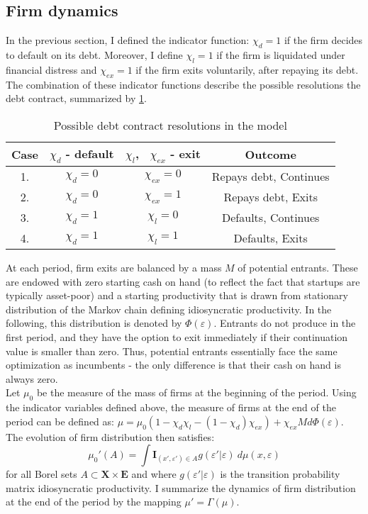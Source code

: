 \documentclass[12pt]{article}
\begin{document}
\subsection{Firm dynamics}
In the previous section, I defined the indicator function: $\chi_d = 1$ if the firm decides to default on its debt. Moreover, I define $\chi_l = 1$ if the firm is liquidated under financial distress and $\chi_{ex} = 1$ if the firm exits voluntarily, after repaying its debt. The combination of these indicator functions describe the possible resolutions the debt contract, summarized by \ref{table:indic}.  \\
\begin{table}[h!]
    \centering
    \begin{tabular}{|c|c|c|c|} 
    \hline
    Case &$\chi_d $ - default & $\chi_l$, \ $\chi_{ex}$ - exit &  Outcome  \\ \hline
    1. & $\chi_d = 0 $ &  $\chi_{ex} = 0$  & Repays debt, Continues \\
    2. & $\chi_d = 0$ &  $\chi_{ex} = 1 $  & Repays debt, Exits   \\
    3. & $\chi_d = 1$ &  $\chi_l = 0$  & Defaults, Continues  \\
    4. & $\chi_d = 1$ &  $\chi_l = 1$ & Defaults, Exits \\ 
    \hline
    \end{tabular}
    \caption{Possible debt contract resolutions in the model}
    \label{table:indic}
\end{table}

\noindent At each period, firm exits are balanced by a mass $M$ of potential entrants. These are endowed with zero starting cash on hand (to reflect the fact that startups are typically asset-poor) and a starting productivity that is drawn from stationary distribution of the Markov chain defining idiosyncratic productivity. In the following, this distribution is denoted by $\Phi(\varepsilon)$. Entrants do not produce in the first period, and they have the option to exit immediately if their continuation value is smaller than zero. Thus, potential entrants essentially face the same optimization as incumbents - the only difference is that their cash on hand is always zero.\vspace{3mm} \\
Let $\mu_0$ be the measure of the mass of firms at the beginning of the period. Using the indicator variables defined above, the measure of firms at the end of the period can be defined as: $\mu = \mu_0( 1 - \chi_d\chi_l - (1-\chi_d)\chi_{ex} )  + \chi_{ex}M d \Phi(\varepsilon) $. The evolution of firm distribution then satisfies:
\begin{equation} \label{eq_firmdim} 
    \mu_{0}'(A) = \int \mathbf{I}_{(x', \varepsilon') \in A} g(\varepsilon'|\varepsilon) \ d \mu (x,\varepsilon)
\end{equation}
for all Borel sets $A \subset  \mathbf{X} \times \mathbf{E} $ and where $g(\varepsilon'|\varepsilon)$ is the transition probability matrix idiosyncratic productivity. I summarize the dynamics of firm distribution at the end of the period by the mapping $ \mu' =\Gamma(\mu)$.
\end{document}
